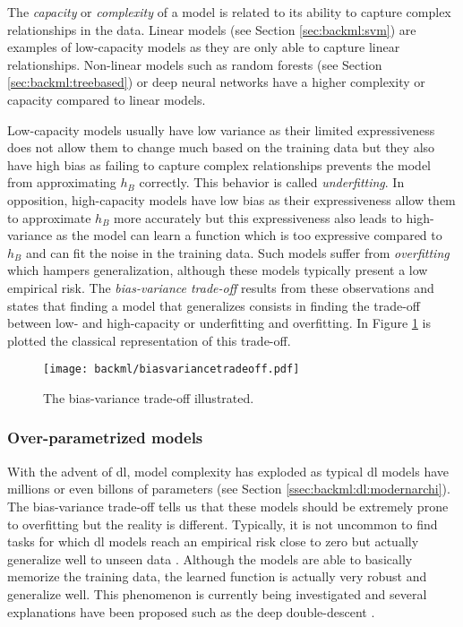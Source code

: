 The \textit{capacity} or \textit{complexity} of a model is related to its ability
to capture complex relationships in the data. Linear models (see Section
\ref{sec:backml:svm}) are examples of low-capacity models as they are only able
to capture linear relationships. Non-linear models such as random forests (see
Section \ref{sec:backml:treebased}) or deep neural networks have a higher complexity
or capacity compared to linear models.

Low-capacity models usually have low variance as their limited expressiveness does
not allow them to change much based on the training data but they also have high
bias as failing to capture complex relationships prevents the model from approximating
$h_B$ correctly. This behavior is called \textit{underfitting}. In opposition,
high-capacity models have low bias as their expressiveness allow them to approximate
$h_B$ more accurately but this expressiveness also leads to high-variance as the
model can learn a function which is too expressive compared to $h_B$ and can fit
the noise in the training data. Such models suffer from \textit{overfitting}
which hampers generalization, although these models typically present
a low empirical risk. The \textit{bias-variance trade-off} results from these
observations and states that finding a model that generalizes consists in finding
the trade-off between low- and high-capacity or underfitting and overfitting. In
Figure \ref{fig:backml:biasvariancetradeoff} is plotted the classical representation
of this trade-off.

\begin{figure}
  \centering
  \texttt{[image: backml/biasvariancetradeoff.pdf]}
  \caption{The bias-variance trade-off illustrated.}
  \label{fig:backml:biasvariancetradeoff}
\end{figure}

\subsubsection{Over-parametrized models}

With the advent of \acrlong{dl}, model complexity has exploded as typical \acrlong{dl}
models have millions or even billons of parameters (see Section
\ref{ssec:backml:dl:modernarchi}). The bias-variance trade-off tells us that these
models should be extremely prone to overfitting but the reality is different.
Typically, it is not uncommon to find tasks for which \acrlong{dl} models reach
an empirical risk close to zero but actually generalize well to unseen data
\parencite{zhang2021understanding}. Although the models are able to basically
memorize the training data, the learned function is actually very robust and generalize well. This
phenomenon is currently being investigated and several explanations have been
proposed such as the deep double-descent \parencite{belkin2019reconciling}.

